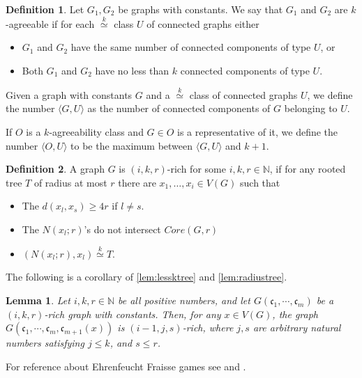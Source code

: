 \documentclass[11pt,notitlepage,a4paper]{article}
\newtheorem{lemma}{Lemma}[section]
\theoremstyle{definition}
\newtheorem{definition}{Definition}[section]
\newcommand{\cc}{\mathfrak{c}}
\newcommand{\N}{\mathbb{N}}
\newcommand{\clist}{\mathfrak{c}_{1}, \cdots, \mathfrak{c}_m}
\newcommand{\morph}[1]{\stackrel{#1}{\simeq}}
\begin{document}
\begin{definition}
	Let $G_1,G_2$ be graphs with constants. We say that $G_1$ and $G_2$ are
	$k$-agreeable if for each $\morph{k}$ class $U$ of connected graphs either
	\begin{itemize}
		\item $G_1$ and $G_2$ have the same number of connected components of type $U$, or
		\item Both $G_1$ and $G_2$ have no less than $k$ connected components of type $U$.
	\end{itemize} 
\end{definition}


Given a graph with constants $G$ and a $\morph{k}$ class of connected
graphs $U$, we define the number $\langle G, U \rangle$ as the number
of connected components of $G$ belonging to $U$. \par
If $O$ is a $k$-agreeability class and $G\in O$ is a
representative of it, we define the number $\langle O, U \rangle$ to
be the maximum between $\langle G,U \rangle$ and $k+1$.

\begin{definition}
	A graph $G$ is $(i,k,r)$-rich for some $i,k,r\in \N$, if for any rooted tree $T$
	of radius at most $r$ there are $x_1,\dots,x_i\in V(G)$ such that
	\begin{itemize}
		\item The $d(x_l,x_s)\geq 4r$ if $l\neq s$.
		\item The $N(x_l;r)$'s do not intersect $Core(G,r)$
		\item $(N(x_l;r),x_l) \morph{k} T$.		
	\end{itemize} 
\end{definition}

The following is a corollary of \cref{lem:lessktree} and \cref{lem:radiustree}.

\begin{lemma} \label{lemm:rich}
	Let $i,k,r\in \N$ be all positive numbers, and let $G(\clist)$
	be a $(i,k,r)$-rich graph with constants. Then, for any $x\in V(G)$,
	the graph \\$G(\clist, \cc_{m+1}(x))$ is $(i-1,j,s)$-rich, 
	where $j,s$ are arbitrary natural numbers satisfying $j\leq k$,
	and $s\leq r$.
\end{lemma}

For reference about Ehrenfeucht Fraisse games see \cite{finitemodeltheory1} and \cite{finitemodeltheory2}.
\end{document}
